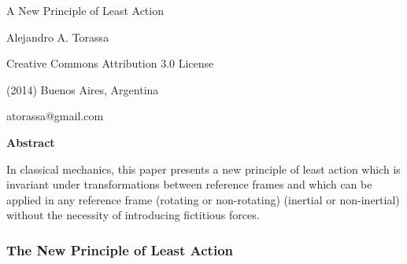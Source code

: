 \documentclass[10pt,fleqn]{article}
\begin{document}
\begin{center}

{\LARGE A New Principle of Least Action}

\bigskip \medskip

Alejandro A. Torassa

\bigskip \medskip

\footnotesize

Creative Commons Attribution 3.0 License

(2014) Buenos Aires, Argentina

atorassa@gmail.com

\bigskip \smallskip

\small

{\bf Abstract}

\bigskip

\parbox{102mm}{In classical mechanics, this paper presents a new principle of least action which is invariant under transformations between reference frames and which can be applied in any reference frame (rotating or non-rotating) (inertial or non-inertial) without the necessity of introducing fictitious forces.}

\end{center}

\normalsize

\vspace{-0.30em}

{\centering\subsubsection*{The New Principle of Least Action}}

\vspace{+0.90em}
\end{document}
